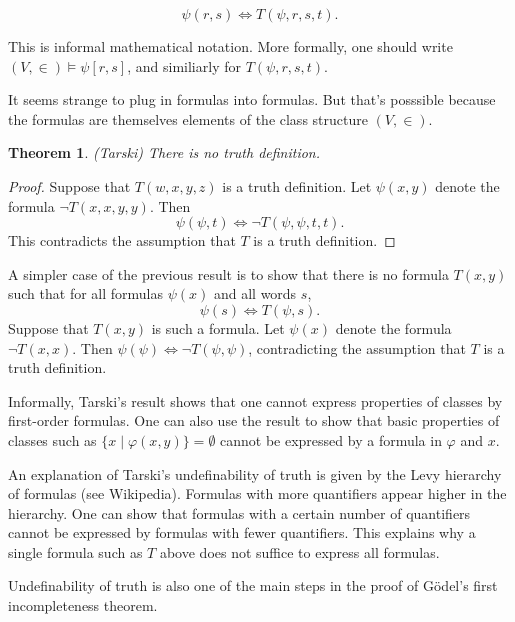 \documentclass[a4paper, 11pt]{amsart}
\newtheorem{theorem}{Theorem}[subsection]
\theoremstyle{remark}
\begin{document}
$$ \psi(r,s) \Longleftrightarrow T(\psi,r,s,t). $$ 

This is informal mathematical notation. 
More formally, one should write $(V,\in) \models  \psi [r,s]$, and similiarly for $T(\psi,r,s,t)$. 

It seems strange to plug in formulas into formulas. But that's posssible because the formulas are themselves elements of the class structure $(V,\in)$. 

\begin{theorem}(Tarski) 
\label{Undefinability of truth in ZFC} 
There is no truth definition. 
\end{theorem} 
\begin{proof} 
Suppose that $T(w,x,y,z)$ is a truth definition. 
Let $\psi(x,y)$ denote the formula $\neg T(x,x,y,y)$. 
Then 
$$ \psi(\psi,t) \Longleftrightarrow \neg T(\psi,\psi,t,t). $$ 
This contradicts the assumption that $T$ is a truth definition. 
\end{proof} 

A simpler case of the previous result is to show that there is no formula $T(x,y)$ such that for all formulas $\psi(x)$ and all words $s$, 
$$ \psi(s) \Longleftrightarrow T(\psi,s). $$ 
Suppose that $T(x,y)$ is such a formula. 
Let $\psi(x)$ denote the formula $\neg T(x,x)$. 
Then 
$ \psi(\psi) \Longleftrightarrow \neg T(\psi,\psi)$, contradicting the assumption that $T$ is a truth definition. 

Informally, Tarski's result shows that one cannot express properties of classes by first-order formulas. 
One can also use the result to show that basic properties of classes such as $\{x\mid \varphi(x,y) \} =\emptyset$ cannot be expressed by a formula in $\varphi $ and $x$. 

An explanation of Tarski's undefinability of truth is given by the Levy hierarchy of formulas (see Wikipedia). 
Formulas with more quantifiers appear higher in the hierarchy. 
One can show that formulas with a certain number of quantifiers cannot be expressed by formulas with fewer quantifiers. 
This explains why a single formula such as $T$ above does not suffice to express all formulas. 

Undefinability of truth is also one of the main steps in the proof of G\"odel's first incompleteness theorem. 

\end{document}
